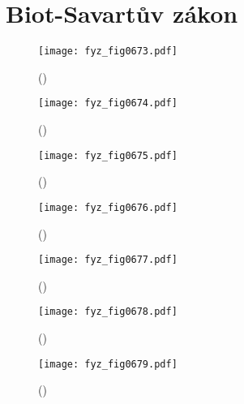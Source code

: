  \section{Biot-Savartův zákon}\label{fyz:IIchapXIVsecVII}

    \begin{figure}[ht!] %
      \centering
      \texttt{[image: fyz\_fig0673.pdf]}
      \caption{
               (\cite[s.~707]{Feynman02})}
      \label{fyz:fig0673}
    \end{figure}

    \begin{figure}[ht!] %
      \centering
      \texttt{[image: fyz\_fig0674.pdf]}
      \caption{
               (\cite[s.~707]{Feynman02})}
      \label{fyz:fig0674}
    \end{figure}

    \begin{figure}[ht!] %
      \centering
      \texttt{[image: fyz\_fig0675.pdf]}
      \caption{
               (\cite[s.~707]{Feynman02})}
      \label{fyz:fig0675}
    \end{figure}

    \begin{figure}[ht!] %
      \centering
      \texttt{[image: fyz\_fig0676.pdf]}
      \caption{
               (\cite[s.~707]{Feynman02})}
      \label{fyz:fig0676}
    \end{figure}
    
    \begin{figure}[ht!] %
      \centering
      \texttt{[image: fyz\_fig0677.pdf]}
      \caption{
               (\cite[s.~707]{Feynman02})}
      \label{fyz:fig0677}
    \end{figure}

    \begin{figure}[ht!] %
      \centering
      \texttt{[image: fyz\_fig0678.pdf]}
      \caption{
               (\cite[s.~707]{Feynman02})}
      \label{fyz:fig0678}
    \end{figure}

    \begin{figure}[ht!] %
      \centering
      \texttt{[image: fyz\_fig0679.pdf]}
      \caption{
               (\cite[s.~707]{Feynman02})}
      \label{fyz:fig0679}
    \end{figure}

